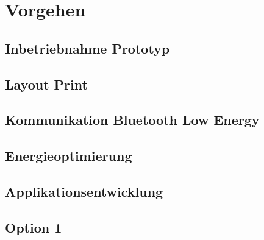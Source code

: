 \chapter{Vorgehen}

\section{Inbetriebnahme Prototyp}

\section{Layout Print}

\section{Kommunikation Bluetooth Low Energy}

\section{Energieoptimierung}

\section{Applikationsentwicklung}

\section{Option 1}






